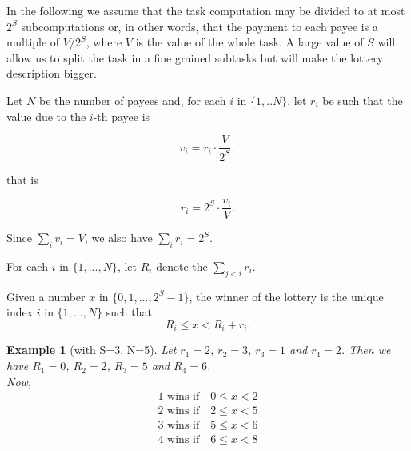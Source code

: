 \documentclass[a4paper]{article}
\newtheorem*{exmp}{Example}
\begin{document}
    In the following we assume that the task computation may be divided to at most $2^S$ subcomputations or,
    in other words, that the payment to each payee is a multiple of $V/2^S$, where $V$ is the value of the whole task.
    A large value of $S$ will allow us to split the task in a fine grained subtasks but will make the lottery
    description bigger.

    Let $N$ be the number of payees and, for each $i$ in $\{1, .. N\}$, let $r_i$ be such that the value due to
    the $i$-th payee is

    \begin{displaymath}
        v_i = r_i \cdot \frac{V}{2^S},
    \end{displaymath}

    that is

    \begin{displaymath}
        r_i = 2^S \cdot \frac{v_i}{V}.
    \end{displaymath}

    Since $\sum_i v_i = V$, we also have $\sum_i r_i = 2^S$.

    For each $i$ in $\{1, ..., N\}$, let $R_i$ denote the $\sum_{j<i} r_i$.

    Given a number $x$ in $\{0, 1 ,... ,2^S-1\}$, the winner of the lottery is the unique index $i$ in $\{1, ..., N\}$
    such that
    \begin{displaymath}
        R_i \leq x < R_i+r_i.
    \end{displaymath}

    \begin{exmp}[with S=3, N=5]
        Let $r_1 = 2$, $r_2 = 3$, $r_3 = 1$ and $r_4 = 2$. Then we have $R_1 = 0$, $R_2 = 2$, $R_3 = 5$ and $R_4 = 6$.\\
        Now,
        \begin{displaymath}
            \begin{array}{c}
                1 \text{ wins if} \quad 0 \leq x < 2\\
                2 \text{ wins if} \quad 2 \leq x < 5\\
                3 \text{ wins if} \quad 5 \leq x < 6\\
                4 \text{ wins if} \quad 6 \leq x < 8
            \end{array}
        \end{displaymath}
    \end{exmp}
\end{document}
